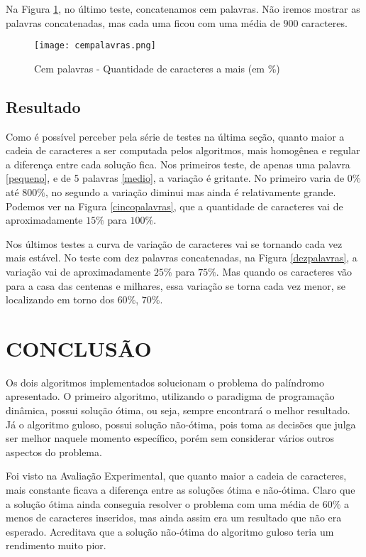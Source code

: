 \documentclass[12pt]{article}
\begin{document}
Na Figura \ref{cempalavras}, no último teste, concatenamos cem palavras. Não iremos mostrar as palavras concatenadas, mas cada uma ficou com uma média de $900$ caracteres.

    \begin{figure}[h!]
        \centering
        \texttt{[image: cempalavras.png]}
        \caption{Cem palavras - Quantidade de caracteres a mais (em \%)}
        \label{cempalavras}
    \end{figure}

\subsection{Resultado}

	Como é possível perceber pela série de testes na última seção, quanto maior a cadeia de caracteres a ser computada pelos algoritmos, mais homogênea e regular a diferença entre cada solução fica. Nos primeiros teste, de apenas uma palavra \ref{pequeno}, e de 5 palavras \ref{medio}, a variação é gritante. No primeiro varia de $0\%$ até $800\%$, no segundo a variação diminui mas ainda é relativamente grande. Podemos ver na Figura \ref{cincopalavras}, que a quantidade de caracteres vai de aproximadamente $15\%$ para $100\%$.

	Nos últimos testes a curva de variação de caracteres vai se tornando cada vez mais estável. No teste com dez palavras concatenadas, na Figura \ref{dezpalavras}, a variação vai de aproximadamente $25\%$ para $75\%$. Mas quando os caracteres vão para a casa das centenas e milhares, essa variação se torna cada vez menor, se localizando em torno dos $60\%$, $70\%$.


\section{CONCLUSÃO}
\label{conclusao}

    Os dois algoritmos implementados solucionam o problema do palíndromo apresentado. O primeiro algoritmo, utilizando o paradigma de programação dinâmica, possui solução ótima, ou seja, sempre encontrará o melhor resultado. Já o algoritmo guloso, possui solução não-ótima, pois toma as decisões que julga ser melhor naquele momento específico, porém sem considerar vários outros aspectos do problema.

    Foi visto na Avaliação Experimental, que quanto maior a cadeia de caracteres, mais constante ficava a diferença entre as soluções ótima e não-ótima. Claro que a solução ótima ainda conseguia resolver o problema com uma média de $60\%$ a menos de caracteres inseridos, mas ainda assim era um resultado que não era esperado. Acreditava que a solução não-ótima do algoritmo guloso teria um rendimento muito pior.
\end{document}

